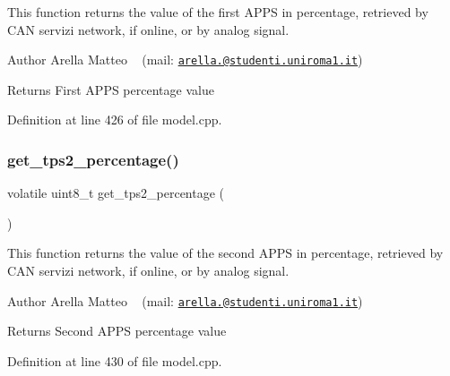 This function returns the value of the first A\+P\+PS in percentage, retrieved by C\+AN servizi network, if online, or by analog signal. 

\begin{DoxyAuthor}{Author}
Arella Matteo ~\newline
 (mail\+: \href{mailto:arella.1646983@studenti.uniroma1.it}{\tt arella.@studenti.\+uniroma1.\+it})
\end{DoxyAuthor}
\begin{DoxyReturn}{Returns}
First A\+P\+PS percentage value 
\end{DoxyReturn}


Definition at line 426 of file model.\+cpp.

\mbox{\label{group___board__model__group_gae563bbe9e3c31913df498ebd7cbf6c10}} 
\subsubsection{\texorpdfstring{get\+\_\+tps2\+\_\+percentage()}{get\_tps2\_percentage()}}
{\footnotesize\ttfamily volatile uint8\+\_\+t get\+\_\+tps2\+\_\+percentage (\begin{DoxyParamCaption}{ }\end{DoxyParamCaption})}



This function returns the value of the second A\+P\+PS in percentage, retrieved by C\+AN servizi network, if online, or by analog signal. 

\begin{DoxyAuthor}{Author}
Arella Matteo ~\newline
 (mail\+: \href{mailto:arella.1646983@studenti.uniroma1.it}{\tt arella.@studenti.\+uniroma1.\+it})
\end{DoxyAuthor}
\begin{DoxyReturn}{Returns}
Second A\+P\+PS percentage value 
\end{DoxyReturn}


Definition at line 430 of file model.\+cpp.

\mbox{\label{group___board__model__group_gace5a444da39d4366693503c53f0841c2}} 

